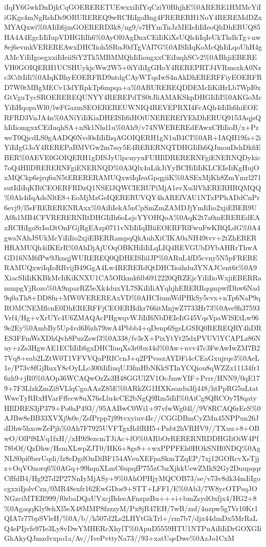 \documentclass[]{article}
\begin{document}
iIqIY6GwkDnDjkCqGOERERETUEwxxiIiIYqCziY0BhjhE\%0ARERE1HMMcYiIiGKgs4mNgRshDs9ORUREREQ9wRCHiIgoBng4FRERERH1NoY4REREMdDZxMYAQxwi\%0AIiIi6jmGOERERD3k8/ng9/s7HYmTnJzMEIeIiIiIeoQhDhERUQ85HA4A4EgcIiIiIupVDHGIiIh6\%0AyOl0AgDnxCEiIiKiXsUQh4iIqIeUkThdhTg+nw8ej6evmkVEREREAwxDHCIioh5SRuJ0dTgVAI7G\%0AISIiIqKoMcQhIiLqoUhH4gAMcYiIiIgoegxxiIiIeiiSiY2Tk5MBMMQhIiIiougxxCEiIuqhSCc2\%0ABhjiEBEREVH0GOIQERH1UCSHUykjcWw2W5+0iYiIiIgGHoY4REREPRTJ4VRmsxkA0Nzc3CdtIiIi\%0AIqKBhyEOERFRD9ntdgCAyWTqsIwS4nAkDhERERFFiyEOERFRD7W0tMBgMECv13dYRpkTp6mpqa+a\%0ARUREREQDDEMcIiKiHrLb7WpI0xGtVguTycSROEREREQUNYY4REREPdTS0tJliAMAKSkpDHGIiIiI\%0AKGoMcYiIiHqopaWl0/lwFGazmSEOEREREUWNIQ4REVEPRXI4FcAQh4iIiIh6hiEOERFRD3VnJA4n\%0ANiYiIiKiaDHEISIi6iHOiUNEREREfYEhDhERUQ9153AqjsQhIiIiomgxxCEiIuqhSA+nSk1Nhd1u\%0Ah9/v74NWEREREdFAwxCHiIioB/x+PzweT0QjcdLS0gAADQ0Nvd0sIiIiIhqAGOIQERH1gN1uB4CI\%0AR+IAQH19fa+2iYiIiIgGJoY4REREPaBMVGw2m7ssy5E4RERERNQTDHGIiIh6QJmouDshDkfiEBER\%0AEVE0GOIQERH1gDISJyUlpcuyyuFUHIlDRERERNFgiENERNQDykic7oQ4HIlDRERERNFgiENERNQD\%0A3Qlx4uLikJiYyBCHiIiIiKLCEIeIiKgHujOxMQCkp6ejrq6uN5tERERERAMUQxwiIqIeaGpqgiiK\%0ASExMjKh8ZmYmrl271sutIiIiIqKBiCEOERFRDzQ1NSElJQWCIERUPiMjA1evXu3lVhERERHRQMQQ\%0Ah4iIqAdsNltE8+EoMjMzGeIQERERUVQY4hAREfVAU1NTxPPhADdCnPr6evj9/l5sFRERERENRAxx\%0AiIiIekA5nCpSmZmZAMDJjYmIiIio2xjiEBER9UA0h1MB4CFVRERERNRtDHGIiIh6oLsjcYYOHQoA\%0AqK2t7a0mEREREdEAxRCHiIgoSrIsd3tOnFGjRgEAzp0711vNIiIiIqIBiiEOERFRlFwuFwKBQLdG\%0A4gwaNAhJSUkMcYiIiIio2xjiEBERRampqQkAuhXiCIKA0aNH49tvv+2tZhERERHRAMUQh4iIKErR\%0AhDjAjUOqOBKHiIiIiLqLIQ4REVGUbDYbAHRrThwAGD16NM6fPw9JknqjWUREREQ0QDHEISIiilJP\%0ARuL4fD5cvny5N5pFRERERAMUQxwiIqIoRRvijB49GgA4Lw4RERERdQtDHCIioihdu3YNAJCent6t\%0A9XiacSIiIiKKBkMcIiKiKNXU1CA5ORkmk6lb6912220QRZEjcYiIiIioWxjiEBERRammpgYjRozo\%0A9nparRZ5eXk4duxYL7SKiIiIiAYqhjhERERRqqmpwfDhw6Nad9q0aTh8+DD8fn+MW0VEREREAxVD\%0AHCIiumWdPHkSy5cvx+nTp6NaP9qROMCNEMflcnE0DhERERFFjCEOERHdkr766itMnjwZ7733Hr73\%0Ave9h37593Vrf4/Hg+vXrUYc4U6ZMAQAcPHgwqvWJiIiI6NbDEIeIiG45VqsVpaWlSEtLw969e2Ey\%0AmbBy5Up4vd6I6zh79iwA4Pbbb4+qDenp6SgsLGSIQ0REREQRY4hDRES3FFmWsXDhQvh8PuzZswf3\%0A338/fv3rX+PixYtYt25dxPVUVlYCAPLz86Nuy+zZs3HgwAE1ECIiIiIi6gxDHCIiuqXs3r0bx44d\%0Aw+uvv47c3FwAwIwZM7B27Vq8+eab2LZtW0T1VFVVQaPRICcnJ+q2PPvsszAYDFi4cCEaGxujrqe3\%0AeL1e/P73v8fGjRuxY8cOyLLc300iIiIiuqUJ3fmHbNKkSTInYCQiou8qWZZx11134fr16zh9+jR0\%0AOp36WCAQwOzZs3H48GGUlZV1OcJmwYIF+Prrr/HNN9/0qE179+7F3LlzkZmZiSVLlqCgoAAzZ85E\%0ARkZG1HXKsozdu3fj448/htPpRG5uLtatWweTyRRxHVarFffccw8uX76sLlu4cCE2bNgQ9Rm5iIiI\%0AiCg8QRCOy7I8qatyHIlDRES3jP379+Po0aP493//95AABwC0Wi1+97vfwWg04l//9V8RCAQ6rEeS\%0AJBw8eBB33XVXj9s0e/ZsfPrpp7j99tvxyiuv4Ic//CGGDBmCyZMn45NPPun26JdDhw5hxowZePjh\%0Ah7F7925UVFTgxRdfRH5+Pnbt2hVRHV9//TXuu+8+OBwO/OlPf8LVq1fxH//xH9i9ezcmTJiAc+fO\%0ARbOrRERERNRDDHGIiOiW4Pf78bOf/QzDhw/HsmXLwpZJT0/HK6+8gs8++wxPPPFEh0HOkSNH0NDQ\%0AgNLS0pi0berUqdi/fz8cDgdOnDiBF154AVeuXEFpaSkmTZqEP/7xj12GORcvXsTjjz+OqVOnorq6\%0AGq+99hquXLmC6upqfP755zCbzXjkkUewZMkS2Gy2DuupqqrCfffdB4/Hg927d2P27NnIyMjASy+9\%0AhOPHjyMQCOB73/se/v73v8dk34mIiIgocgxxiIjolvCzn/0MR48exfr162EwGDos9+STT+LFF1/E\%0Ab3/7W8ycOTPsqJONGzciMTER999/f0zbaDQaUVxcjBdeeAFnzpzBu+++i+bmZsydOxfjx4/HG2+8\%0AgaqqKly9ehXl5eX48MMP8fzzzyM/Px8jR47EH/7wB/znf/4nzpw5g7Vr10Kr1QIA7r77bpSVleH/\%0A/b//h507d2Ls2LHYtGkTrl+/rm7b7/djx44dmDx5MrRaLQ4ePIjvfe97Ie3Ly8vDwYMHERcXhylT\%0ApuD5559HTU1NTPuAiIiIiDrGOXGIiGhAkyQJmzdvxpo1a/Av//IvePvttyNa73//93+xatUqeDwe\%0AzJo1CxM
\end{document}
